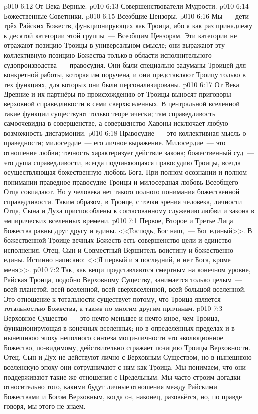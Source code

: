 \vs p010 6:12 От Века Верные.
\vs p010 6:13 Совершенствователи Мудрости.
\vs p010 6:14 Божественные Советники.
\vs p010 6:15 Всеобщие Цензоры.
\vs p010 6:16 \pc Мы~--- дети трёх Райских Божеств, функционирующих как Троица, ибо я как раз принадлежу к десятой категории этой группы~--- Всеобщим Цензорам. Эти категории не отражают позицию Троицы в универсальном смысле; они выражают эту коллективную позицию Божества только в области исполнительного судопроизводства~--- правосудия. Они были специально задуманы Троицей для конкретной работы, которая им поручена, и они представляют Троицу только в тех функциях, для которых они были персонализированы.
\vs p010 6:17 От Века Древние и их партнёры по происхождению от Троицы выносят приговоры верховной справедливости в семи сверхвселенных. В центральной вселенной такие функции существуют только теоретически; там справедливость самоочевидна в совершенстве, а совершенство Хавоны исключает любую возможность дисгармонии.
\vs p010 6:18 Правосудие~--- это коллективная мысль о праведности; милосердие~--- его личное выражение. Милосердие~--- это отношение любви; точность характеризует действие закона; божественный суд~--- это душа справедливости, всегда подчиняющаяся правосудию Троицы, всегда осуществляющая божественную любовь Бога. При полном осознании и полном понимании праведное правосудие Троицы и милосердная любовь Всеобщего Отца совпадают. Но у человека нет такого полного понимания божественной справедливости. Таким образом, в Троице, с точки зрения человека, личности Отца, Сына и Духа приспособлены к согласованному служению любви и закона в эмпирических вселенных времени.
\vs p010 7:1 Первое, Второе и Третье Лица Божества равны друг другу и едины. <<Господь, Бог наш,~--- Бог единый>>. В божественной Троице вечных Божеств есть совершенство цели и единство исполнения. Отец, Сын и Совместный Вершитель воистину и божественно едины. Истинно написано: <<Я первый и я последний, и нет Бога, кроме меня>>.
\vs p010 7:2 \pc Так, как вещи представляются смертным на конечном уровне, Райская Троица, подобно Верховному Существу, занимается только целым~--- всей планетой, всей вселенной, всей сверхвселенной, всей большой вселенной. Это отношение к тотальности существует потому, что Троица является тотальностью Божества, а также по многим другим причинам.
\vs p010 7:3 Верховное Существо~--- это нечто меньшее и нечто иное, чем Троица, функционирующая в конечных вселенных; но в определённых пределах и в нынешнюю эпоху неполного синтеза мощи\hyp{}личности это эволюционное Божество, по\hyp{}видимому, действительно отражает позицию Троицы Верховности. Отец, Сын и Дух не действуют лично с Верховным Существом, но в нынешнюю вселенскую эпоху они сотрудничают с ним как Троица. Мы понимаем, что они поддерживают такие же отношения с Предельным. Мы часто строим догадки относительно того, какими будут личные отношения между Райскими Божествами и Богом Верховным, когда он, наконец, разовьётся, но, по правде говоря, мы этого не знаем.

